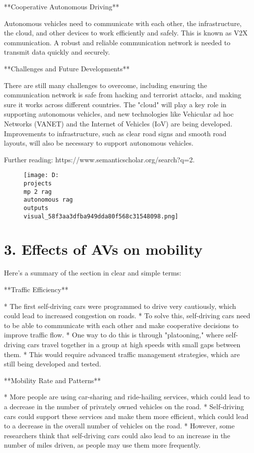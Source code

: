 \documentclass[12pt,a4paper]{article}
\begin{document}
**Cooperative Autonomous Driving**

Autonomous vehicles need to communicate with each other, the infrastructure, the cloud, and other devices to work efficiently and safely. This is known as V2X communication. A robust and reliable communication network is needed to transmit data quickly and securely.

**Challenges and Future Developments**

There are still many challenges to overcome, including ensuring the communication network is safe from hacking and terrorist attacks, and making sure it works across different countries. The "cloud" will play a key role in supporting autonomous vehicles, and new technologies like Vehicular ad hoc Networks (VANET) and the Internet of Vehicles (IoV) are being developed. Improvements to infrastructure, such as clear road signs and smooth road layouts, will also be necessary to support autonomous vehicles.

Further reading: https://www.semanticscholar.org/search?q=2.%
\begin{figure}[h]
\centering
\texttt{[image: D:\\projects\\mp 2 rag\\autonomous rag\\outputs\\visual\_58f3aa3dfba949dda80f568c31548098.png]}
\end{figure}
\section{3. Effects of AVs on mobility}
Here's a summary of the section in clear and simple terms:

**Traffic Efficiency**

* The first self-driving cars were programmed to drive very cautiously, which could lead to increased congestion on roads.
* To solve this, self-driving cars need to be able to communicate with each other and make cooperative decisions to improve traffic flow.
* One way to do this is through "platooning," where self-driving cars travel together in a group at high speeds with small gaps between them.
* This would require advanced traffic management strategies, which are still being developed and tested.

**Mobility Rate and Patterns**

* More people are using car-sharing and ride-hailing services, which could lead to a decrease in the number of privately owned vehicles on the road.
* Self-driving cars could support these services and make them more efficient, which could lead to a decrease in the overall number of vehicles on the road.
* However, some researchers think that self-driving cars could also lead to an increase in the number of miles driven, as people may use them more frequently.
\end{document}
